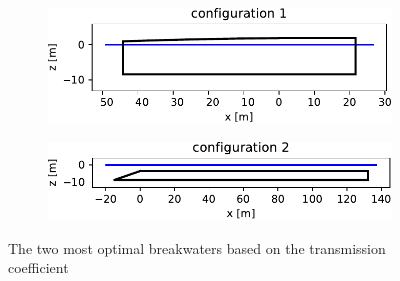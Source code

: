 \begin{figure}[h]
    \centering
    \begin{subfigure}[b]{0.49\textwidth}
        \centering
        \includegraphics[width=\textwidth]{figures/ComFLOW/Breakwater Geometries/DI1 moving/optima_Kt/breakwater_geometry1.pdf}
        \caption[]%
        {{\small}}    
        \label{fig: opt breakwater 1 moving kt}
    \end{subfigure}
    \hfill
    \begin{subfigure}[b]{0.49\textwidth}  
        \centering 
        \includegraphics[width=\textwidth]{figures/ComFLOW/Breakwater Geometries/DI1 moving/optima_Kt/breakwater_geometry2.pdf}
        \caption[]%
        {{\small}}    
        \label{fig: opt breakwater 2 moving kt}
    \end{subfigure}
    
    \caption{The two most optimal breakwaters based on the transmission coefficient}
    \label{fig: two most optimal breakwaters moving kt}
\end{figure}







